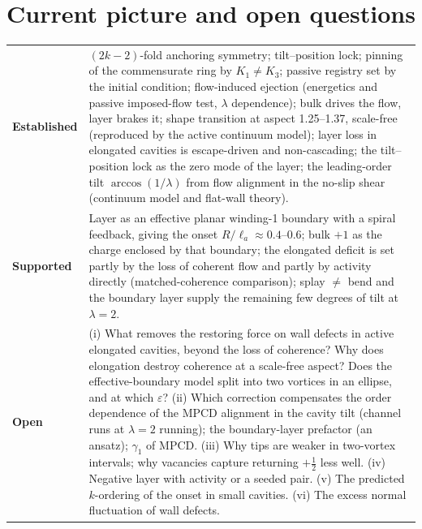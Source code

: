 \documentclass[11pt,a4paper]{article}
\newcommand{\half}{\tfrac12}
\newcommand{\la}{\ell_a}
\begin{document}
\section{Current picture and open questions}
\begin{table}[H]\centering\small
\begin{tabularx}{\textwidth}{@{}lX@{}}
\toprule
\textbf{Established} & $(2k-2)$-fold anchoring symmetry; tilt--position lock; pinning of the commensurate ring by $K_1\neq K_3$; passive registry set by the initial condition;
flow-induced ejection (energetics and passive imposed-flow test, $\lambda$ dependence); bulk drives the flow, layer brakes it; shape transition at aspect 1.25--1.37, scale-free (reproduced by the active continuum model);
layer loss in elongated cavities is escape-driven and non-cascading; the tilt--position lock as the zero mode of the layer; the leading-order tilt $\arccos(1/\lambda)$ from flow
alignment in the no-slip shear (continuum model and flat-wall theory). \\
\textbf{Supported} & Layer as an effective planar winding-1 boundary with a spiral feedback, giving the onset $R/\la\approx0.4$--0.6; bulk $+1$ as the charge enclosed
by that boundary; the elongated deficit is set partly by the loss of coherent flow and partly by activity directly (matched-coherence comparison); splay $\neq$ bend and the
boundary layer supply the remaining few degrees of tilt at $\lambda=2$. \\
\textbf{Open} & (i) What removes the restoring force on wall defects in active elongated cavities, beyond the loss of coherence? Why does elongation destroy coherence at a scale-free aspect? Does the effective-boundary
model split into two vortices in an ellipse, and at which $\varepsilon$? (ii) Which correction compensates the order dependence of the MPCD alignment in the cavity tilt (channel runs at $\lambda=2$ running); the boundary-layer prefactor (an ansatz); $\gamma_1$ of MPCD. (iii) Why tips are weaker in two-vortex
intervals; why vacancies capture returning $+\half$ less well. (iv) Negative layer with activity or a seeded pair. (v) The predicted $k$-ordering of the onset in small cavities.
(vi) The excess normal fluctuation of wall defects. \\
\bottomrule
\end{tabularx}
\end{table}
\end{document}
